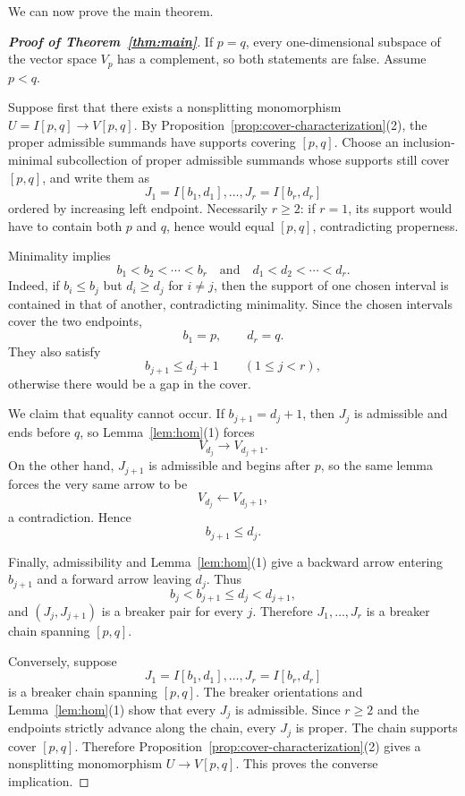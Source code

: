 \documentclass[11pt]{amsart}
\numberwithin{equation}{section}
\theoremstyle{definition}
\begin{document}
We can now prove the main theorem.

\begin{proof}[\bf Proof of Theorem~\ref{thm:main}]
If $p=q$, every one-dimensional subspace of the vector space $V_p$ has a
complement, so both statements are false.  Assume $p<q$.

Suppose first that there exists a nonsplitting monomorphism
$U=I[p,q]\to V[p,q]$.  By
Proposition~\ref{prop:cover-characterization}(2), the proper admissible
summands have supports covering $[p,q]$.  Choose an inclusion-minimal
subcollection of proper admissible summands whose supports still cover
$[p,q]$, and write them as
\[
J_1=I[b_1,d_1],\dots,J_r=I[b_r,d_r]
\]
ordered by increasing left endpoint.  Necessarily $r\ge2$: if $r=1$, its
support would have to contain both $p$ and $q$, hence would equal $[p,q]$,
contradicting properness.

Minimality implies
\[
b_1<b_2<\cdots<b_r
\quad\text{and}\quad
d_1<d_2<\cdots<d_r.
\]
Indeed, if $b_i\le b_j$ but $d_i\ge d_j$ for $i\ne j$, then the support of
one chosen interval is contained in that of another, contradicting
minimality.  Since the chosen intervals cover the two endpoints,
\[
b_1=p,
\qquad
d_r=q.
\]
They also satisfy
\[
b_{j+1}\le d_j+1
\qquad(1\le j<r),
\]
otherwise there would be a gap in the cover.

We claim that equality cannot occur.  If
$b_{j+1}=d_j+1$, then $J_j$ is admissible and ends before $q$, so
Lemma~\ref{lem:hom}(1) forces
\[
V_{d_j}\longrightarrow V_{d_j+1}.
\]
On the other hand, $J_{j+1}$ is admissible and begins after $p$, so the
same lemma forces the very same arrow to be
\[
V_{d_j}\longleftarrow V_{d_j+1},
\]
a contradiction.  Hence
\[
b_{j+1}\le d_j.
\]

Finally, admissibility and Lemma~\ref{lem:hom}(1) give a backward arrow entering
$b_{j+1}$ and a forward arrow leaving $d_j$.  Thus
\[
b_j<b_{j+1}\le d_j<d_{j+1},
\]
and $(J_j,J_{j+1})$ is a breaker pair for every $j$.  Therefore
$J_1,\dots,J_r$ is a breaker chain spanning $[p,q]$.

Conversely, suppose
\[
J_1=I[b_1,d_1],\dots,J_r=I[b_r,d_r]
\]
is a breaker chain spanning $[p,q]$.  The breaker orientations and
Lemma~\ref{lem:hom}(1) show that every $J_j$ is admissible.  Since
$r\ge2$ and the endpoints strictly advance along the chain, every $J_j$ is
proper.  The chain supports cover $[p,q]$.  Therefore
Proposition~\ref{prop:cover-characterization}(2) gives a nonsplitting
monomorphism $U\to V[p,q]$.  This proves the converse implication.
\end{proof}
\end{document}
